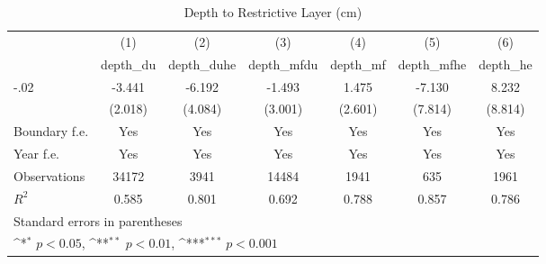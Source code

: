 \begin{table}[htbp]\centering
\def\sym#1{\ifmmode^{#1}\else\(^{#1}\)\fi}
\caption{Depth to Restrictive Layer (cm)}
\begin{tabular}{l*{6}{c}}
\hline\hline
                    &\multicolumn{1}{c}{(1)}&\multicolumn{1}{c}{(2)}&\multicolumn{1}{c}{(3)}&\multicolumn{1}{c}{(4)}&\multicolumn{1}{c}{(5)}&\multicolumn{1}{c}{(6)}\\
                    &\multicolumn{1}{c}{depth\_du}&\multicolumn{1}{c}{depth\_duhe}&\multicolumn{1}{c}{depth\_mfdu}&\multicolumn{1}{c}{depth\_mf}&\multicolumn{1}{c}{depth\_mfhe}&\multicolumn{1}{c}{depth\_he}\\
\hline
-.02                &      -3.441         &      -6.192         &      -1.493         &       1.475         &      -7.130         &       8.232         \\
                    &     (2.018)         &     (4.084)         &     (3.001)         &     (2.601)         &     (7.814)         &     (8.814)         \\
[1em]
Boundary f.e.       &         Yes         &         Yes         &         Yes         &         Yes         &         Yes         &         Yes         \\
[1em]
Year f.e.           &         Yes         &         Yes         &         Yes         &         Yes         &         Yes         &         Yes         \\
\hline
Observations        &       34172         &        3941         &       14484         &        1941         &         635         &        1961         \\
\(R^{2}\)           &       0.585         &       0.801         &       0.692         &       0.788         &       0.857         &       0.786         \\
\hline\hline
\multicolumn{7}{l}{\footnotesize Standard errors in parentheses}\\
\multicolumn{7}{l}{\footnotesize \sym{*} \(p<0.05\), \sym{**} \(p<0.01\), \sym{***} \(p<0.001\)}\\
\end{tabular}
\end{table}
